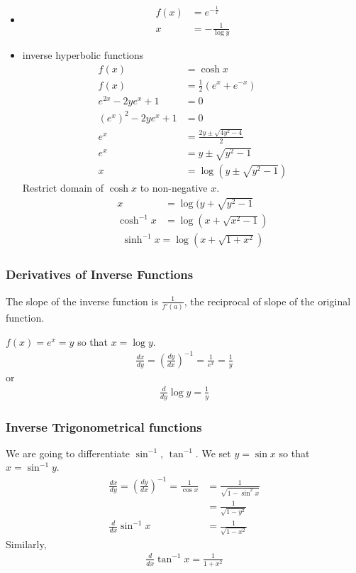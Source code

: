 \begin{ex} \mbox \\
\begin{itemize}
\item 
\begin{align*}
f(x) & = e^{- \frac 1 x} \\
x & = - \frac 1 {\log y}
\end{align*}
\item
inverse hyperbolic functions
\begin{align*}
f(x) & = \cosh x \\
f(x) & = \frac 1 2 \left( e^x + e^{-x} \right) \\
e^{2x} - 2ye^x +1 & = 0 \\
(e^x)^2 -2ye^x +1 & = 0 \\
e^x & = \frac{2y \pm \sqrt{4y^2-4}} 2 \\
e^x & = y \pm \sqrt{y^2-1} \\
x & = \log \left( y \pm \sqrt{y^2-1} \right)
\end{align*}
Restrict domain of $\cosh x$ to non-negative $x$.
\begin{align*}
x & = \log ( y + \sqrt{y^2-1} \\
\cosh^{-1} x & = \log \left( x + \sqrt{x^2-1} \right)
\end{align*}
\begin{align*}
\sinh^{-1} x = \log \left( x + \sqrt{1+x^2} \right)
\end{align*}
\end{itemize}
\end{ex}


\subsubsection{Derivatives of Inverse Functions}
The slope of the inverse function is $\frac 1 {f'(a)}$, the reciprocal of slope of the original function.
\begin{ex}
$f(x) = e^x = y$ so that $x = \log y$.
\begin{align*}
\frac{dx}{dy} = \left( \frac{dy}{dx} \right)^{-1} = \frac{1}{e^x} = \frac 1 y
\end{align*}
or
\begin{align*}
\frac{d}{dy} \log y = \frac 1 y
\end{align*}
\end{ex}


\subsubsection{Inverse Trigonometrical functions}
We are going to differentiate $\sin^{-1}$, $\tan^{-1}$. We set $y= \sin x $ so that $x = \sin^{-1} y$.
\begin{align*}
\frac{dx}{dy} = \left( \frac {dy}{dx} \right)^{-1}  = \frac 1 {\cos x} & = \frac 1 {\sqrt{1-\sin^2 x }} \\
& = \frac 1 {\sqrt{1-y^2}} \\
\frac d {dx} \sin^{-1} x & = \frac 1 {\sqrt{1 -x^2}}
\end{align*}
Similarly,
\begin{align*}
\frac{d}{dx} \tan^{-1} x = \frac {1}{1+x^2}
\end{align*}
 
